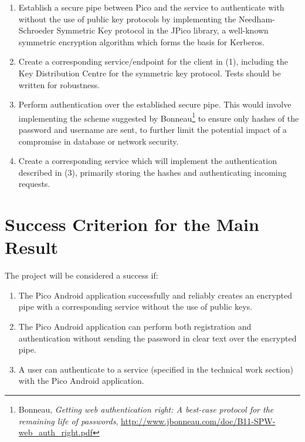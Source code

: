 \documentclass[12pt,a4paper,twoside]{article}
\begin{document}
\begin{enumerate}

\item Establish a secure pipe between Pico and the service to authenticate with without the use of public key protocols by implementing the Needham-Schroeder Symmetric Key protocol in the JPico library, a well-known symmetric encryption algorithm which forms the basis for Kerberos.

\item Create a corresponding service/endpoint for the client in (1), including the Key Distribution Centre for the symmetric key protocol. Tests should be written for robustness.

\item Perform authentication over the established secure pipe. This would involve implementing the scheme suggested by Bonneau\footnote{Bonneau, \textit{Getting web authentication right: A best-case protocol for the remaining life of passwords}, \url{http://www.jbonneau.com/doc/B11-SPW-web_auth_right.pdf}} to ensure only hashes of the password and username are sent, to further limit the potential impact of a compromise in database or network security.

\item Create a corresponding service which will implement the authentication described in (3), primarily storing the hashes and authenticating incoming requests.

\end{enumerate}

\section*{Success Criterion for the Main Result}


The project will be considered a success if:

\begin{enumerate}
	
\item The Pico Android application successfully and reliably creates an encrypted pipe with a corresponding service without the use of public keys.

\item The Pico Android application can perform both registration and authentication without sending the password in clear text over the encrypted pipe.

\item A user can authenticate to a service (specified in the technical work section) with the Pico Android application.

\end{enumerate}
\end{document}
